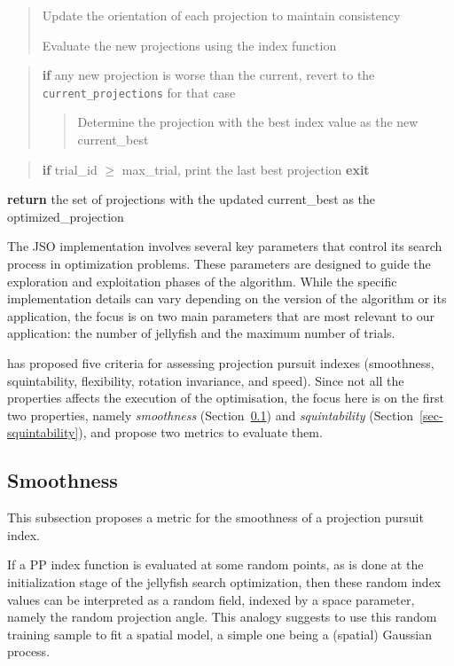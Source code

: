 \documentclass[
  number,
  preprint,
  3p]{elsarticle}
\begin{document}
\begin{tcolorbox}
\begin{quote}
Update the orientation of each projection to maintain consistency

Evaluate the new projections using the index function
\end{quote}

\begin{quote}
\textbf{if} any new projection is worse than the current, revert to the
\texttt{current\_projections} for that case

\begin{quote}
Determine the projection with the best index value as the new
current\_best
\end{quote}
\end{quote}

\begin{quote}
\textbf{if} trial\_id \(\geq\) max\_trial, print the last best
projection \textbf{exit}
\end{quote}

\textbf{return} the set of projections with the updated current\_best as
the optimized\_projection

\end{tcolorbox}

The JSO implementation involves several key parameters that control its
search process in optimization problems. These parameters are designed
to guide the exploration and exploitation phases of the algorithm. While
the specific implementation details can vary depending on the version of
the algorithm or its application, the focus is on two main parameters
that are most relevant to our application: the number of jellyfish and
the maximum number of trials.

\citet{laa_using_2020} has proposed five criteria for assessing
projection pursuit indexes (smoothness, squintability, flexibility,
rotation invariance, and speed). Since not all the properties affects
the execution of the optimisation, the focus here is on the first two
properties, namely \emph{smoothness} (Section~\ref{sec-smoothness}) and
\emph{squintability} (Section~\ref{sec-squintability}), and propose two
metrics to evaluate them.

\subsection{Smoothness}\label{sec-smoothness}

This subsection proposes a metric for the smoothness of a projection
pursuit index.

If a PP index function is evaluated at some random points, as is done at
the initialization stage of the jellyfish search optimization, then
these random index values can be interpreted as a random field, indexed
by a space parameter, namely the random projection angle. This analogy
suggests to use this random training sample to fit a spatial model, a
simple one being a (spatial) Gaussian process.
\end{document}
